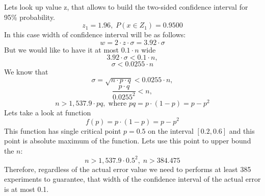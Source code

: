 Lets look up value z, that allows to build the two-sided confidence interval for 95\% probability.
 \[
z_1=1.96,\; P(x\in Z_1)=0.9500
\]
In this case width of confidence interval will be as follows:
 \[
w = 2\cdot z \cdot\sigma= 3.92\cdot\sigma
\]
But we would like to have it at most $0.1\cdot n$ wide
 \[
3.92\cdot\sigma<0.1\cdot n,
\]
 \[
\sigma<0.0255\cdot n
\]
We know that
 \[
\sigma=\sqrt{n\cdot p\cdot q}<0.0255\cdot n,
\]
 \[
\frac{p\cdot q}{0.0255^2}<n,
\]
 \[
n>1,537.9\cdot pq,\; \text{where } pq = p\cdot(1-p)=p - p^2
\]
Lets take a look at function 
 \[
f(p) = p\cdot(1-p)=p - p^2
\]
This function has single critical point $p = 0.5$ on the interval $[0.2, 0.6]$ and this point is absolute maximum of the function. Lets use this point to upper bound the $n$:
 \[
n>1,537.9\cdot 0.5^2,\; n>384.475
\]
Therefore, regardless of the actual error value we need to performs at least 385 experiments to guarantee, that width of the confidence interval of the actual error is at most 0.1.
